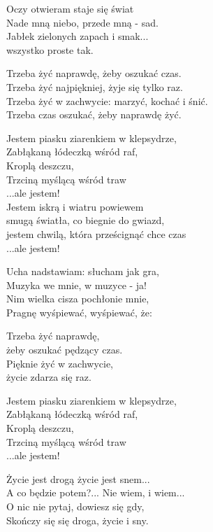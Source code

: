 \begin{text}
    \begin{scriptTwelve}
    Oczy otwieram staje się świat\\
    Nade mną niebo, przede mną - sad.\\
    Jabłek zielonych zapach i smak...\\
    wszystko proste tak.

    Trzeba żyć naprawdę, żeby oszukać czas.\\
    Trzeba żyć najpiękniej, żyje się tylko raz.\\
    Trzeba żyć w zachwycie: marzyć, kochać i śnić.\\
    Trzeba czas oszukać, żeby naprawdę żyć.

    \vin Jestem piasku ziarenkiem w klepsydrze,\\
    \vin Zabłąkaną łódeczką wśród raf,\\
    \vin Kroplą deszczu,\\
    \vin Trzciną myślącą wśród traw\\
    \vin ...ale jestem!\\
    \vin Jestem iskrą i wiatru powiewem\\
    \vin smugą światła, co biegnie do gwiazd,\\
    \vin jestem chwilą, która prześcignąć chce czas\\
    \vin ...ale jestem!

    Ucha nadstawiam: słucham jak gra,\\
    Muzyka we mnie, w muzyce - ja!\\
    Nim wielka cisza pochłonie mnie,\\
    Pragnę wyśpiewać, wyśpiewać, że:

    Trzeba żyć naprawdę,\\
    żeby oszukać pędzący czas.\\
    Pięknie żyć w zachwycie,\\
    życie zdarza się raz.

    \vin Jestem piasku ziarenkiem w klepsydrze,\\
    \vin Zabłąkaną łódeczką wśród raf,\\
    \vin Kroplą deszczu,\\
    \vin Trzciną myślącą wśród traw\\
    \vin ...ale jestem!

    Życie jest drogą życie jest snem...\\
    A co będzie potem?... Nie wiem, i wiem...\\
    O nic nie pytaj, dowiesz się gdy,\\
    Skończy się się droga, życie i sny.


\end{scriptTwelve}
\end{text}
